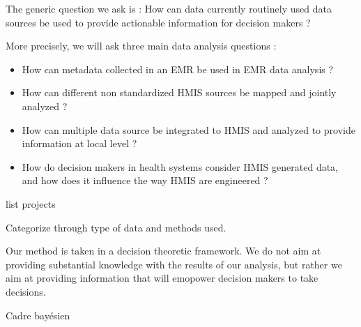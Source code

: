	The generic question we ask is : How can data currently routinely used data sources be used to provide actionable information for decision makers ?

	More precisely, we will ask three main data analysis questions :
	\begin{itemize}
		\item How can metadata collected in an EMR be used in EMR data analysis ?
		\item How can different non standardized HMIS sources be mapped and jointly analyzed ?
		\item How can multiple data source be integrated to HMIS and analyzed to provide information at local level ?
		\item How do decision makers in health systems consider HMIS generated data, and how does it influence the way HMIS are engineered ?
	\end{itemize}



	list projects

	Categorize through type of data and methods used.


	Our method is taken in a decision theoretic framework. We do not aim at providing substantial knowledge with the results of our analysis, but rather we aim at providing information that will emopower decision makers to take decisions.

	Cadre bayésien %


